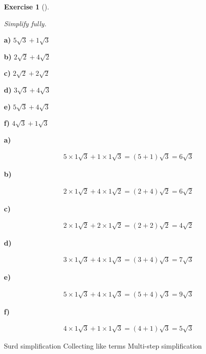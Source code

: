\documentclass[
  letterpaper,
  DIV=11,
  numbers=noendperiod]{scrreprt}
\theoremstyle{definition}
\newtheorem{exercise}{Exercise}[chapter]
\theoremstyle{remark}
\begin{document}
\begin{exercise}[]\protect\hypertarget{exr-u2-44}{}\label{exr-u2-44}

\emph{Simplify fully.}

\textbf{a)} \(\displaystyle 5\sqrt{3}+1\sqrt{3}\)

\textbf{b)} \(\displaystyle 2\sqrt{2}+4\sqrt{2}\)

\textbf{c)} \(\displaystyle 2\sqrt{2}+2\sqrt{2}\)

\textbf{d)} \(\displaystyle 3\sqrt{3}+4\sqrt{3}\)

\textbf{e)} \(\displaystyle 5\sqrt{3}+4\sqrt{3}\)

\textbf{f)} \(\displaystyle 4\sqrt{3}+1\sqrt{3}\)

\begin{tcolorbox}[enhanced jigsaw, opacitybacktitle=0.6, coltitle=black, arc=.35mm, colframe=quarto-callout-tip-color-frame, colback=white, bottomrule=.15mm, left=2mm, colbacktitle=quarto-callout-tip-color!10!white, titlerule=0mm, opacityback=0, title=\textcolor{quarto-callout-tip-color}{\faLightbulb}\hspace{0.5em}{🔍 View Solutions}, leftrule=.75mm, breakable, rightrule=.15mm, bottomtitle=1mm, toptitle=1mm, toprule=.15mm]

\textbf{a)}

\[
\begin{aligned}
5\times 1\sqrt{3}+1\times 1\sqrt{3}=(5+1)\sqrt{3}=6\sqrt{3}
\end{aligned}
\]

\textbf{b)}

\[
\begin{aligned}
2\times 1\sqrt{2}+4\times 1\sqrt{2}=(2+4)\sqrt{2}=6\sqrt{2}
\end{aligned}
\]

\textbf{c)}

\[
\begin{aligned}
2\times 1\sqrt{2}+2\times 1\sqrt{2}=(2+2)\sqrt{2}=4\sqrt{2}
\end{aligned}
\]

\textbf{d)}

\[
\begin{aligned}
3\times 1\sqrt{3}+4\times 1\sqrt{3}=(3+4)\sqrt{3}=7\sqrt{3}
\end{aligned}
\]

\textbf{e)}

\[
\begin{aligned}
5\times 1\sqrt{3}+4\times 1\sqrt{3}=(5+4)\sqrt{3}=9\sqrt{3}
\end{aligned}
\]

\textbf{f)}

\[
\begin{aligned}
4\times 1\sqrt{3}+1\times 1\sqrt{3}=(4+1)\sqrt{3}=5\sqrt{3}
\end{aligned}
\]

\end{tcolorbox}

{Surd simplification} {Collecting like terms} {Multi-step
simplification}

\end{exercise}
\end{document}
